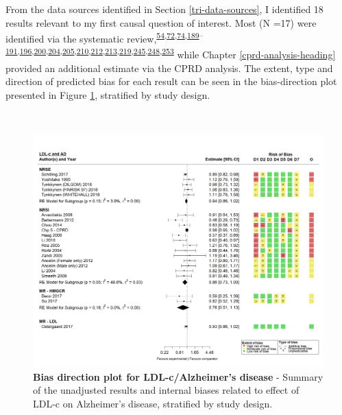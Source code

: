 \documentclass[a4paper, twoside]{templates/ociamthesis}
\begin{document}
From the data sources identified in Section \ref{tri-data-sources}, I identified 18 results relevant to my first causal question of interest. Most (N =17) were identified via the systematic review,\textsuperscript{\protect\hyperlink{ref-schilling2017}{54},\protect\hyperlink{ref-ostergaard2015}{72},\protect\hyperlink{ref-benn2017}{74},\protect\hyperlink{ref-ancelin2012}{189}--\protect\hyperlink{ref-bettermann2012}{191},\protect\hyperlink{ref-chou2014}{196},\protect\hyperlink{ref-haag2009}{200},\protect\hyperlink{ref-li2004}{204},\protect\hyperlink{ref-li2010}{205},\protect\hyperlink{ref-rea2005}{210},\protect\hyperlink{ref-reitz2010}{212},\protect\hyperlink{ref-smeeth2009}{213},\protect\hyperlink{ref-zandi2005}{219},\protect\hyperlink{ref-tynkkynen2018}{245},\protect\hyperlink{ref-yoshitake1995}{248},\protect\hyperlink{ref-so2017}{253}} while Chapter \ref{cprd-analysis-heading} provided an additional estimate via the CPRD analysis. The extent, type and direction of predicted bias for each result can be seen in the bias-direction plot presented in Figure \ref{fig:ldlAdBiasDirection}, stratified by study design.

~





\begin{figure}[H]
\includegraphics[width=1\linewidth]{figures/tri/midlife_AD} \caption[Bias direction plot for LDL-c/Alzheimer's disease]{\textbf{Bias direction plot for LDL-c/Alzheimer's disease} - Summary of the unadjusted results and internal biases related to effect of LDL-c on Alzheimer's disease, stratified by study design.}\label{fig:ldlAdBiasDirection}
\end{figure}
\end{document}
